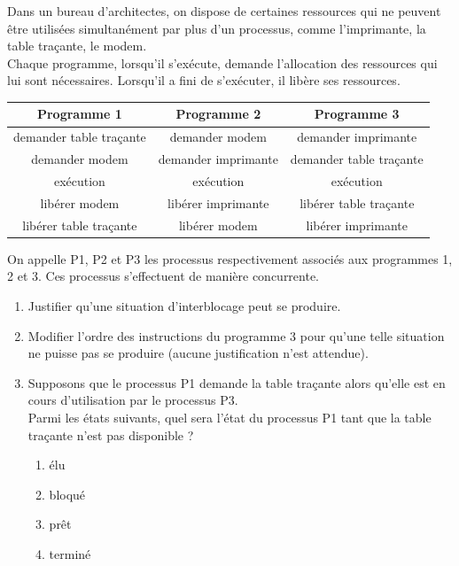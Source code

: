 \documentclass[a4paper,12pt,french]{book}
\begin{document}
    Dans un bureau d’architectes, on dispose de certaines ressources qui ne peuvent être utilisées simultanément par plus d’un processus, comme l’imprimante, la table traçante, le modem.\\
    Chaque programme, lorsqu'il s’exécute, demande l'allocation des ressources qui lui sont nécessaires. Lorsqu'il a fini de s’exécuter, il libère ses ressources.
     \begin{center}
        \begin{tabular}{|c|c|c|}
            \hline
            \rowcolor{UGLiOrange} \textbf{\color{white}Programme 1 }& \textbf{\color{white}Programme 2} & \textbf{\color{white}Programme 3}  \\
            \hline
            demander table traçante & demander modem & demander imprimante \\
            \hline
            demander modem& demander imprimante & demander table traçante  \\
            \hline
            exécution& exécution & exécution   \\
            \hline
            libérer modem& libérer imprimante & libérer table traçante   \\
            \hline
            libérer table traçante& libérer modem & libérer imprimante   \\
            \hline
        \end{tabular}
    \end{center}
    On appelle P1, P2 et P3 les processus respectivement associés aux programmes 1, 2 et 3. Ces processus s'effectuent de manière concurrente.

    \begin{enumerate}[\bfseries 1.]
        \item 	Justifier qu'une situation d'interblocage peut se produire.
        \item 	Modifier l'ordre des instructions du programme 3 pour qu'une telle situation ne puisse pas se produire (aucune justification n'est attendue).
        \item 	Supposons que le processus P1 demande la table traçante alors qu'elle est en cours d'utilisation par le processus P3.\\
                Parmi les états suivants, quel sera l'état du processus P1 tant que la table traçante n'est pas disponible ?

                \begin{multicols}{4}
                    \begin{enumerate}[\bfseries a.]
                        \item 	élu
                        \item 	bloqué
                        \item 	prêt
                        \item 	terminé
                    \end{enumerate}
                \end{multicols}
    \end{enumerate}
\end{document}
